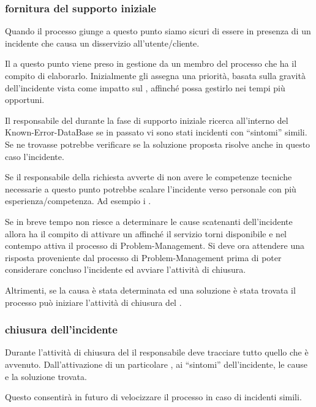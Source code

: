 \subsubsection[Fornitura del supporto iniziale]{fornitura del supporto iniziale}
Quando il processo giunge a questo punto siamo sicuri di essere in presenza di un incidente che causa un disservizio all'utente/cliente. 

Il  a questo punto viene preso in gestione da un membro del processo che ha il compito di elaborarlo. Inizialmente gli assegna una priorità, basata sulla gravità dell'incidente vista come impatto sul , affinché possa gestirlo nei tempi più opportuni.

Il responsabile del  durante la fase di supporto iniziale ricerca all'interno del \ac{Known-Error-DataBase} se in passato vi sono stati incidenti con ``sintomi'' simili. Se ne trovasse potrebbe verificare se la soluzione proposta risolve anche in questo caso l'incidente.

Se il responsabile della richiesta avverte di non avere le competenze tecniche necessarie a questo punto potrebbe scalare l'incidente verso personale con più esperienza/competenza. Ad esempio i .

Se in breve tempo non riesce a determinare le cause scatenanti dell'incidente allora ha il compito di attivare un  affinché il servizio torni disponibile e nel contempo attiva il processo di \ac{Problem-Management}. Si deve ora attendere una risposta proveniente dal processo di \ac{Problem-Management} prima di poter considerare concluso l'incidente ed avviare l'attività di chiusura.

Altrimenti, se la causa è stata determinata ed una soluzione è stata trovata il processo può iniziare l'attività di chiusura del .

\subsubsection[Chiusura dell'incidente]{chiusura dell'incidente}
Durante l'attività di chiusura del  il responsabile deve tracciare tutto quello che è avvenuto. Dall'attivazione di un particolare , ai ``sintomi'' dell'incidente, le cause e la soluzione trovata.

Questo consentirà in futuro di velocizzare il processo in caso di incidenti simili.

